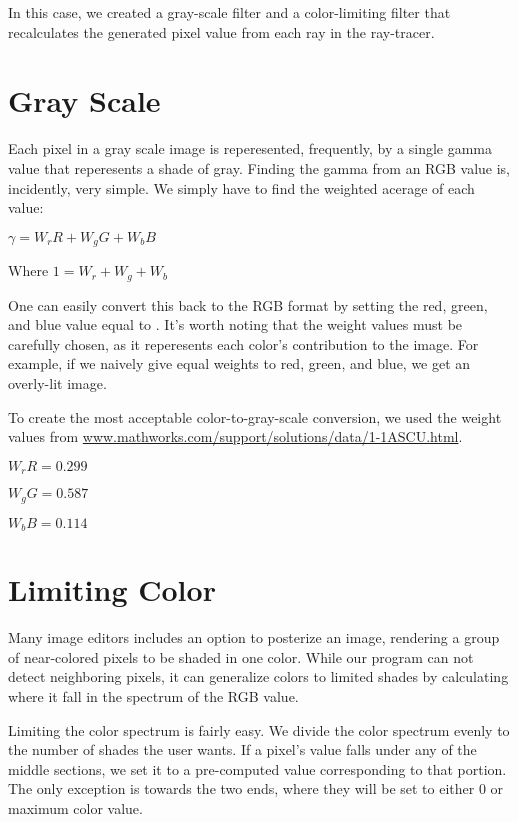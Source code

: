 \documentclass{acmsiggraph}
\begin{document}
In this case, we created a gray-scale filter and a color-limiting filter
that recalculates the generated pixel value from each ray in the ray-tracer.


\section*{Gray Scale}
Each pixel in a gray scale image is reperesented, frequently, by a single
gamma value that reperesents a shade of gray.  Finding the gamma from an
RGB value is, incidently, very simple.  We simply have to find the weighted
acerage of each value:

$\gamma = W_{r}R + W_{g}G + W_{b}B$

Where $1 = W_{r} + W_{g} + W_{b}$

One can easily convert this back to the RGB format by setting the red,
green, and blue value equal to \gamma.  It's worth noting that the weight
values must be carefully chosen, as it reperesents each color's contribution
to the image.  For example, if we naively give equal weights to red, green,
and blue, we get an overly-lit image.

To create the most acceptable color-to-gray-scale conversion, we used
the weight values from
\url{www.mathworks.com/support/solutions/data/1-1ASCU.html}.

$W_{r}R = 0.299$

$W_{g}G = 0.587$

$W_{b}B = 0.114$


\section*{Limiting Color}
Many image editors includes an option to posterize an image, rendering
a group of near-colored pixels to be shaded in one color.  While our program
can not detect neighboring pixels, it can generalize colors to limited shades
by calculating where it fall in the spectrum of the RGB value.

Limiting the color spectrum is fairly easy.  We divide the color spectrum evenly to
the number of shades the user wants.  If a pixel's value falls under any of the middle
sections, we set it to a pre-computed value corresponding to that portion.  The only
exception is towards the two ends, where they will be set to either 0 or maximum color
value.
\end{document}
